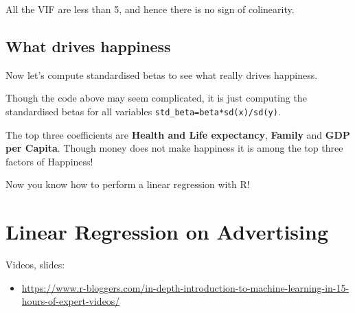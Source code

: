 \documentclass[]{book}
\newenvironment{Shaded}{\begin{snugshade}}{\end{snugshade}}
\newcommand{\CommentTok}[1]{\textcolor[rgb]{0.56,0.35,0.01}{\textit{#1}}}
\newcommand{\DecValTok}[1]{\textcolor[rgb]{0.00,0.00,0.81}{#1}}
\newcommand{\KeywordTok}[1]{\textcolor[rgb]{0.13,0.29,0.53}{\textbf{#1}}}
\newcommand{\NormalTok}[1]{#1}
\newcommand{\OperatorTok}[1]{\textcolor[rgb]{0.81,0.36,0.00}{\textbf{#1}}}
\newcommand{\StringTok}[1]{\textcolor[rgb]{0.31,0.60,0.02}{#1}}
\providecommand{\tightlist}{%
  \setlength{\itemsep}{0pt}\setlength{\parskip}{0pt}}
\begin{document}
All the VIF are less than 5, and hence there is no sign of colinearity.

\hypertarget{what-drives-happiness}{%
\section{What drives happiness}\label{what-drives-happiness}}

Now let's compute standardised betas to see what really drives happiness.

\begin{Shaded}
\end{Shaded}

Though the code above may seem complicated, it is just computing the standardised betas for all variables \texttt{std\_beta=beta*sd(x)/sd(y)}.

The top three coefficients are \textbf{Health and Life expectancy}, \textbf{Family} and \textbf{GDP per Capita}. Though money does not make happiness it is among the top three factors of Happiness!

Now you know how to perform a linear regression with R!

\hypertarget{linear-regression-on-advertising}{%
\chapter{Linear Regression on Advertising}\label{linear-regression-on-advertising}}

Videos, slides:

\begin{itemize}
\tightlist
\item
  \url{https://www.r-bloggers.com/in-depth-introduction-to-machine-learning-in-15-hours-of-expert-videos/}
\end{itemize}
\end{document}
